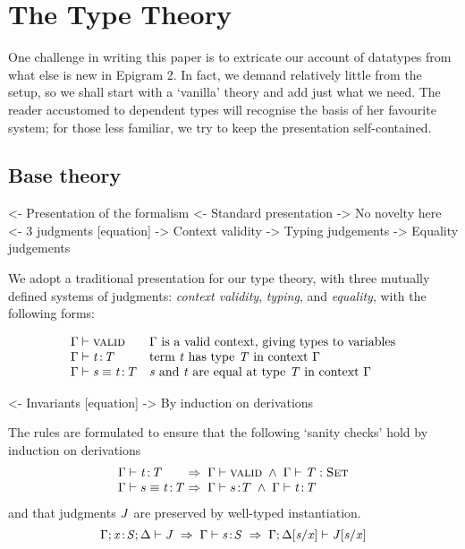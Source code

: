 
\section{The Type Theory}
\label{sec:type-theory}

One challenge in writing this paper is to extricate our account of datatypes from what else is new in Epigram 2. In fact, we demand relatively little from the setup, so we shall start with a `vanilla' theory and add just what we need. The reader accustomed to dependent types will recognise the basis of her favourite system; for those less familiar, we try to keep the presentation self-contained.

\subsection{Base theory}

\begin{wstructure}
<- Presentation of the formalism
    <- Standard presentation
        -> No novelty here
    <- 3 judgments [equation]
        -> Context validity
        -> Typing judgements
        -> Equality judgements
\end{wstructure}

We adopt a traditional presentation for our type
theory, with three mutually defined systems of judgments:
\emph{context validity}, \emph{typing}, and \emph{equality},
with the following forms:


\[
\begin{array}{ll}
\Gamma \vdash \textsc{valid}                & \mbox{\(\Gamma\) is a valid context, giving types to variables} \\
\Gamma \vdash \mathit{t}\!:\!\mathit{T}           & \mbox{term \(\mathit{t}\) has type \(\mathit{T}\) in context \(\Gamma\)} \\
\Gamma \vdash \mathit{s} \equiv \mathit{t}\!:\!\mathit{T}  & \mbox{\(\mathit{s}\) and \(\mathit{t}\) are equal at type \(\mathit{T}\) in context \(\Gamma\)} \\
\end{array}
\]

\begin{wstructure}
    <- Invariants [equation]
        -> By induction on derivations
\end{wstructure}

The rules are formulated to ensure that the
following `sanity checks' hold by induction on derivations
\[
\begin{array}{l@{\;\Rightarrow\;\;}l}
\G            \vdash \Bhab{\M{t}}{\M{T}}            
    & \G \vdash \Valid\; \wedge\; \G\vdash\Type{\M{T}} \\
\G            \vdash s \equiv \Bhab{\M{t}}{\M{T}}   
    & \G \vdash \Bhab{s}{T} \;\wedge\; \G\vdash \Bhab{\M{t}}{\M{T}}
\end{array} \]
and that judgments \(\mathit{J}\) are preserved by well-typed instantiation.
\[
\G ; \xS ; \Delta \vdash \M{J}            \;\Rightarrow\;      
    \G \vdash \Bhab{\M{s}}{\M{S}} \;\Rightarrow\; 
          \G ; \Delta[\M{s}/\x] \vdash \M{J}[\M{s}/\x] 
\]

